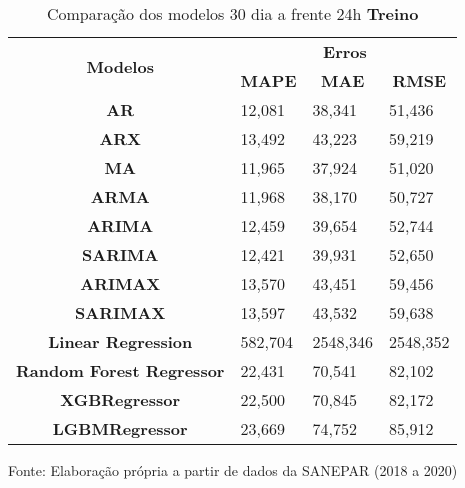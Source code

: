 \begin{table}[H]
	\centering
	\caption{Comparação dos modelos 30 dia a frente 24h \textbf{Treino} }\label{tb:30-24trn}
	\begin{tabular}{@{}clll@{}}
		\toprule
		\multirow{2}{*}{\textbf{Modelos}} & \multicolumn{3}{c}{\textbf{Erros}}                                                                       \\ \cmidrule(l){2-4} 
		& \multicolumn{1}{c}{\textbf{MAPE}} & \multicolumn{1}{c}{\textbf{MAE}} & \multicolumn{1}{c}{\textbf{RMSE}} \\ \hline
\textbf{AR}                       & 12,081                            & 38,341                           & 51,436                            \\
\textbf{ARX}                      & 13,492                            & 43,223                           & 59,219                            \\
\textbf{MA}                       & 11,965                            & 37,924                           & 51,020                            \\
\textbf{ARMA}                     & 11,968                            & 38,170                           & 50,727                            \\
\textbf{ARIMA}                    & 12,459                            & 39,654                           & 52,744                            \\
\textbf{SARIMA}                   & 12,421                            & 39,931                           & 52,650                            \\
\textbf{ARIMAX}                   & 13,570                            & 43,451                           & 59,456                            \\
\textbf{SARIMAX}                  & 13,597                            & 43,532                           & 59,638                            \\
\textbf{Linear Regression}        & 582,704                           & 2548,346                         & 2548,352                          \\
\textbf{Random Forest Regressor}  & 22,431                            & 70,541                           & 82,102                            \\
\textbf{XGBRegressor}             & 22,500                            & 70,845                           & 82,172                            \\
\textbf{LGBMRegressor}            & 23,669                            & 74,752                           & 85,912                            \\ \bottomrule
	\end{tabular}

Fonte: Elaboração própria a partir de dados da SANEPAR (2018 a 2020)
\end{table}

